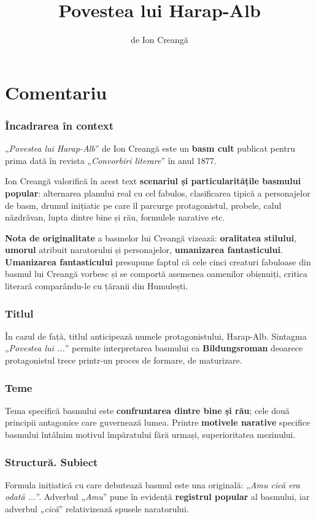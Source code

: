 \documentclass{article}
\title{Povestea lui Harap-Alb}
\author{de Ion Creangă}
\date{}
\newcommand{\qu}[1]{„\emph{#1}”}
\begin{document}
\maketitle

\part*{Comentariu}
\section{Încadrarea în context}
\qu{Povestea lui Harap-Alb} de Ion Creangă este un \textbf{basm cult} publicat pentru prima dată în revista \qu{Convorbiri literare} în anul 1877.

Ion Creangă valorifică în acest text \textbf{scenariul și particularitățile basmului popular}: alternarea planului real cu cel fabulos, clasificarea tipică a personajelor de basm, drumul inițiatic pe care îl parcurge protagonistul, probele, calul năzdrăvan, lupta dintre bine și rău, formulele narative etc.

\textbf{Nota de originalitate} a basmelor lui Creangă vizează: \textbf{oralitatea stilului}, \textbf{umorul} atribuit naratorului și personajelor, \textbf{umanizarea fantasticului}. \textbf{Umanizarea fantasticului} presupune faptul că cele cinci creaturi fabuloase din basmul lui Creangă vorbesc și se comportă asemenea oamenilor obișnuiți, critica literară comparându-le cu țăranii din Humulești.
\section{Titlul}
În cazul de față, titlul anticipează numele protagonistului, Harap-Alb. Sintagma \qu{Povestea lui ...} permite interpretarea basmului ca \textbf{Bildungsroman} deoarece protagonistul trece printr-un proces de formare, de maturizare.
\section{Teme}
Tema specifică basmului este \textbf{confruntarea dintre bine și rău}; cele două principii antagonice care guvernează lumea. Printre \textbf{motivele narative} specifice basmului întâlnim motivul împăratului fără urmași, superioritatea mezinului.
\section{Structură. Subiect}
Formula inițiatică cu care debutează basmul este una originală: \qu{Amu cică era odată ...}. Adverbul \qu{Amu} pune în evidență \textbf{registrul popular} al basmului, iar adverbul \qu{cică} relativizează spusele naratorului.
\end{document}
